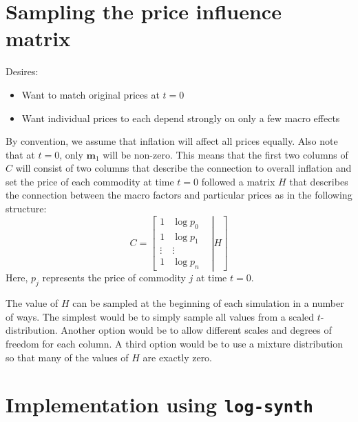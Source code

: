 \documentclass[11pt]{article}
\begin{document}
\section{Sampling the price influence matrix}
Desires:
\begin{itemize}
\item Want to match original prices at $t=0$
\item Want individual prices to each depend strongly on only a few macro effects
\end{itemize}
By convention, we assume that inflation will affect all prices equally. 
Also note that at $t=0$, only $\mathbf m_1$ will be non-zero. This means that the first two columns of $C$ will consist of two columns that describe the connection to overall inflation and set the price of each commodity at time $t=0$ followed a matrix $H$ that describes the connection between the macro factors and particular prices as in the following structure:
\[
 C = 
\left[
\left.
\begin{matrix}
1&\log p_0  \\
1&\log p_1  \\
\vdots &\vdots &   \\
1&\log p_n & 
\end{matrix}
\right|
H
\right]
\]
Here, $p_j$ represents the price of commodity $j$ at time $t=0$.

The value of $H$ can be sampled at the beginning of each simulation in a number of ways. The simplest would be to simply sample all values from a scaled $t$-distribution. Another option would be to allow different scales and degrees of freedom for each column. A third option would be to use a mixture distribution so that many of the values of $H$ are exactly zero.

\section{Implementation using {\tt {log-synth}}}
\end{document}
